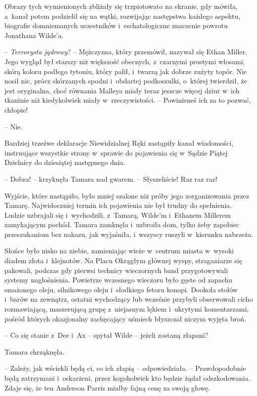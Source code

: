 \documentclass[oneside,polish,11pt,sfheadings]{mwbk}
\begin{document}
Obrazy tych wymienionych zbliżały się trzpiotowato na ekranie, gdy
mówiła, a~kanał potem podzielił się na wątki, rozwijając następstwa
każdego aspektu, biografie domniemanych uczestników i~eschatologiczne
znaczenie powrotu Jonathana Wilde'a.

-- \emph{Terrorysta jądrowy}? -- Mężczyzna, który przemówił, nazywał się
Ethan Miller. Jego wygląd był starszy niż większość obecnych, z~czarnymi
prostymi włosami, skórą koloru podłego tytoniu, który palił, i~twarzą
jak dobrze zużyty topór. Nie nosił nic, prócz skórzanych spodni i~obdartej podkoszulki, o~której twierdził, że jest oryginalna, choć
równania Malleya miały teraz jeszcze więcej dziur w~ich tkaninie niż
kiedykolwiek miały w~rzeczywistości. -- Powinieneś ich za to pozwać,
chłopie!

-- Nie.

Bardziej trzeźwe deklaracje Niewidzialnej Ręki zastąpiły kanał
wiadomości, instruujące wszystkie strony w~sprawie do pojawienia się w~Sądzie Piątej Dzielnicy do dziesiątej następnego dnia.

-- Dobra! -- krzyknęła Tamara nad gwarem. -- Słyszeliście! Raz raz raz!

Wyjście, które nastąpiło, było mniej szalone niż próby jego
zorganizowania przez Tamarę. Najwidoczniej termin ich pojawienia nie był
trudny do spełnienia. Ludzie uzbrajali się i~wychodzili, z~Tamarą,
Wilde'm i~Ethanem Millerem zamykającym pochód. Tamara zamknęła i~uzbroiła dom, tylko żeby zapobiec przeszukaniom bez nakazu, jak
wyjaśniła, i~wszyscy ruszyli w~kierunku nabrzeża.

Słońce było nisko na niebie, zamieniając wieże w~centrum miasta w~wysoki
diadem złota i~klejnotów. Na Placu Okrągłym głównej wyspy, straganiarze
się pakowali, podczas gdy pierwsi technicy wieczornych band
przygotowywali systemy nagłośnienia. Powietrze wczesnego wieczoru było
gęste od zapachu smażonego oleju, silnikowego oleju i~słodkiego fetoru
konopi. Dookoła stołów i~barów na zewnątrz, ostatni wychodzący lub
wcześnie przybyli obserwowali cicho rozmawiającą, maszerującą grupę z~niejasnym lękiem i~ukrytymi komentarzami, pośród których okazjonalny
zachęcający uśmiech błyszczał niczym wyjęta broń.

-- Co się stanie z~Dee i~Ax -- spytał Wilde -- jeżeli zostaną złapani?

Tamara chrząknęła. 

-- Zależy, jak wściekli będą ci, co ich złapią -- odpowiedziała. -- Prawdopodobnie będą zatrzymani i~oskarżeni, przez
kogokolwiek kto będzie żądał odszkodowania. Zdaje się, że ten Anderson
Parris miałby fajną cenę za swoją głowę.
\end{document}
